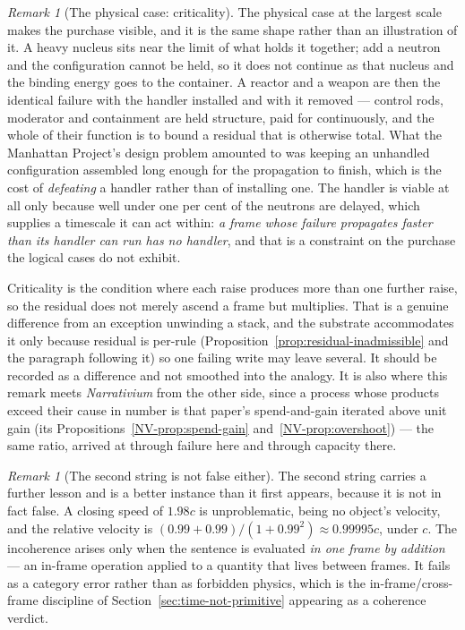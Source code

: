 \documentclass[11pt,a4paper]{article}
\theoremstyle{remark}\newtheorem{remark}[definition]{Remark}
\begin{document}
\begin{remark}[The physical case: criticality]\label{rem:criticality}
The physical case at the largest scale makes the purchase visible, and it is the same shape rather than
an illustration of it. A heavy nucleus sits near the limit of what holds it together; add a neutron and
the configuration cannot be held, so it does not continue as that nucleus and the binding energy goes
to the container. A reactor and a weapon are then the identical failure with the handler installed and
with it removed --- control rods, moderator and containment are held structure, paid for continuously,
and the whole of their function is to bound a residual that is otherwise total. What the Manhattan Project's design problem amounted to was keeping an unhandled configuration
assembled long enough for the propagation to finish, which is the cost of \emph{defeating} a handler
rather than of installing one. The handler is viable at all only because well under one per cent of the
neutrons are delayed, which supplies a timescale it can act within: \emph{a frame whose failure
propagates faster than its handler can run has no handler}, and that is a constraint on the purchase the
logical cases do not exhibit.

Criticality
is the condition where each raise produces more than one further raise, so the residual does not merely
ascend a frame but multiplies. That is a genuine difference from an exception unwinding a stack, and
the substrate accommodates it only because residual is per-rule (Proposition~\ref{prop:residual-inadmissible} and the paragraph following it) so one
failing write may leave several. It should be recorded as a difference and not smoothed into the
analogy. It is also where this remark meets \emph{Narrativium} from the other side, since a process
whose products exceed their cause in number is that paper's spend-and-gain iterated above unit gain
(its Propositions~\ref{NV-prop:spend-gain} and~\ref{NV-prop:overshoot}) ---
the same ratio, arrived at through failure here and through capacity there.
\end{remark}

\begin{remark}[The second string is not false either]\label{rem:second-string}
The second string carries a further lesson and is a better instance than it first appears, because it
is not in fact false. A closing speed of $1.98c$ is unproblematic, being no object's velocity, and the
relative velocity is $(0.99+0.99)/(1+0.99^2)\approx0.99995c$, under $c$. The incoherence arises only
when the sentence is evaluated \emph{in one frame by addition} --- an in-frame operation applied to a
quantity that lives between frames. It fails as a category error rather than as forbidden physics,
which is the in-frame/cross-frame discipline of Section~\ref{sec:time-not-primitive} appearing as a
coherence verdict.
\end{remark}
\end{document}
